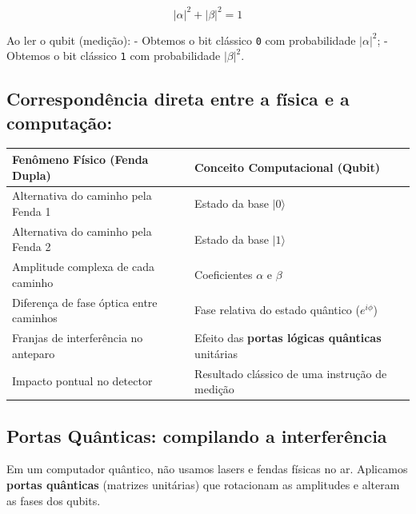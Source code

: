 \documentclass[
  brazilian,
]{report}
\newcounter{none} %
\begin{document}
\[
|\alpha|^2 + |\beta|^2 = 1
\]

Ao ler o qubit (medição): - Obtemos o bit clássico \texttt{0} com
probabilidade \(|\alpha|^2\); - Obtemos o bit clássico \texttt{1} com
probabilidade \(|\beta|^2\).

\subsection{Correspondência direta entre a física e a
computação:}\label{corresponduxeancia-direta-entre-a-fuxedsica-e-a-computauxe7uxe3o}

{\def\LTcaptype{none} %
\begin{longtable}[]{@{}
  >{\raggedright\arraybackslash}p{}
  >{\raggedright\arraybackslash}p{}@{}}
\toprule\noalign{}
\begin{minipage}[b]{\linewidth}\raggedright
Fenômeno Físico (Fenda Dupla)
\end{minipage} & \begin{minipage}[b]{\linewidth}\raggedright
Conceito Computacional (Qubit)
\end{minipage} \\
\midrule\noalign{}
\endhead
\bottomrule\noalign{}
\endlastfoot
Alternativa do caminho pela Fenda 1 & Estado da base \(|0\rangle\) \\
Alternativa do caminho pela Fenda 2 & Estado da base \(|1\rangle\) \\
Amplitude complexa de cada caminho & Coeficientes \(\alpha\) e
\(\beta\) \\
Diferença de fase óptica entre caminhos & Fase relativa do estado
quântico (\(e^{i\phi}\)) \\
Franjas de interferência no anteparo & Efeito das \textbf{portas lógicas
quânticas} unitárias \\
Impacto pontual no detector & Resultado clássico de uma instrução de
medição \\
\end{longtable}
}

\subsection{Portas Quânticas: compilando a
interferência}\label{portas-quuxe2nticas-compilando-a-interferuxeancia}

Em um computador quântico, não usamos lasers e fendas físicas no ar.
Aplicamos \textbf{portas quânticas} (matrizes unitárias) que rotacionam
as amplitudes e alteram as fases dos qubits.
\end{document}
